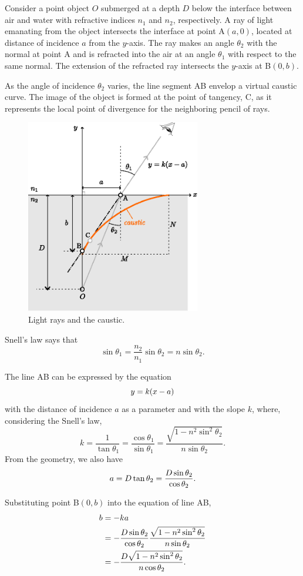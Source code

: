 \documentclass[twocolumn]{article}
\begin{document}
Consider a point object $O$ submerged at a depth $D$ below the interface between air and water with refractive indices $n_1^{}$ and $n_2^{}$, respectively. A ray of light emanating from the object intersects the interface at point A$(a, 0)$, located at distance of incidence $a$ from the $y$-axis. The ray makes an angle $\theta_2$ with the normal at point A and is refracted into the air at an angle $\theta_1$ with respect to the same normal. The extension of the refracted ray intersects the $y$-axis at B$(0, b)$.

As the angle of incidence $\theta_2$ varies, the line segment AB envelop a virtual caustic curve. The image of the object is formed at the point of tangency, C, as it represents the local point of divergence for the neighboring pencil of rays.

\begin{figure}
	\centering
	\includegraphics[width=3in]{figs/g237.eps}
	\caption{Light rays and the caustic.}
	\label{fig:geometry}
\end{figure}

Snell's law says that
$$ \sin\theta_1 = \frac{n_2^{}}{n_1^{}} \sin\theta_2 = n\sin\theta_2.$$

The line AB can be expressed by the equation
$$y=k(x-{a})$$
with the distance of incidence $a$ as a parameter and with the slope $k$,
where, considering the Snell's law,
$$k=\dfrac{1}{\tan\theta_1}=\dfrac{\cos\theta_1}{\sin\theta_1}
=\dfrac{\sqrt{1-n^2\sin^2\theta_2}}{n\sin\theta_2}.$$
From the geometry, we also have
$${a} = D\tan\theta_2 = \dfrac{D\sin\theta_2}{\cos\theta_2}.$$

Substituting point B$(0, b)$ into the equation of line AB,
$$\begin{aligned}
	{b} &= -k{a} \\
	&= -\dfrac{D\sin\theta_2}{\cos\theta_2}
	\dfrac{\sqrt{1-n^2\sin^2\theta_2}}{n\sin\theta_2}\\
	&=-\dfrac{D\sqrt{1-n^2\sin^2\theta_2}}{n\cos\theta_2}.
\end{aligned}$$
\end{document}
